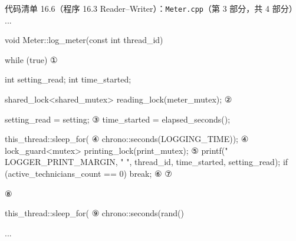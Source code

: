 \begin{codeboxt}{代码清单 16.6（程序 16.3 Reader–Writer）：\texttt{Meter.cpp}（第 3 部分，共 4 部分）}
...

void Meter::log_meter(const int thread_id)
{
    while (true)                                                     ①

    {
        int setting_read;
        int time_started;

        {
            shared_lock<shared_mutex> reading_lock(meter_mutex);     ②
            {
                setting_read = setting;                              ③
                time_started = elapsed_seconds();

                this_thread::sleep_for(                              ④
                                    chrono::seconds(LOGGING_TIME));  ④
                {
                    lock_guard<mutex> printing_lock(print_mutex);    ⑤
                    {
                        printf("%
                               LOGGER_PRINT_MARGIN, " ",
                               thread_id, time_started,
                               setting_read);
                    }
                    if (active_technicians_count == 0) break;        ⑥
                }                                                    ⑦
            }
        }                                                            ⑧

        this_thread::sleep_for(                                      ⑨
            chrono::seconds(rand()%
    }
}

...
\end{codeboxt}
\par
{}\par
{}\par
{}\par
{}\par
{}\par
{}\par
{}\par
{}\par

